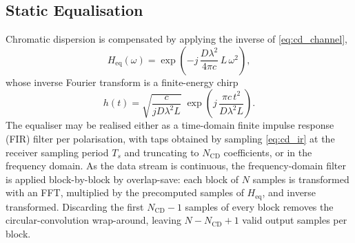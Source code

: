 \documentclass[12pt,a4paper]{report}
\begin{document}
\subsection{Static Equalisation}
Chromatic dispersion is compensated by applying the inverse of \cref{eq:cd_channel},
\begin{equation}
    H_\mathrm{eq}(\omega) = \exp\!\left(-j\,\frac{D\lambda^2}{4\pi c}\,L\,\omega^2\right),
    \label{eq:cd_tf}
\end{equation}
whose inverse Fourier transform is a finite-energy chirp
\begin{equation}
    h(t) = \sqrt{\frac{c}{j D \lambda^2 L}}\;\exp\!\left(j\,\frac{\pi c\,t^2}{D\lambda^2 L}\right).
    \label{eq:cd_ir}
\end{equation}
The equaliser may be realised either as a time-domain finite impulse response (FIR) filter per polarisation, with taps obtained by sampling \cref{eq:cd_ir} at the receiver sampling period $T_s$ and truncating to $N_\mathrm{CD}$ coefficients, or in the frequency domain. As the data stream is continuous, the frequency-domain filter is applied block-by-block by overlap-save: each block of $N$ samples is transformed with an FFT, multiplied by the precomputed samples of $H_\mathrm{eq}$, and inverse transformed. Discarding the first $N_\mathrm{CD}-1$ samples of every block removes the circular-convolution wrap-around, leaving $N-N_\mathrm{CD}+1$ valid output samples per block.
\end{document}
